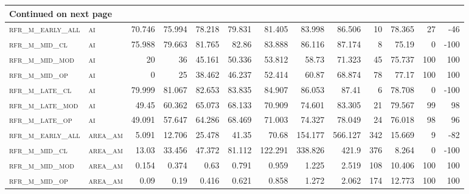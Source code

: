 \begin{landscape}
\begin{center}
\begin{footnotesize}
\begin{longtable}{llrrrrrrrr|rrr}
\hline \multicolumn{13}{|l|}{{Continued on next page}} \\ \hline
\endfoot

\hline \hline
\endlastfoot

\textsc{rfr\_m\_early\_all} & \textsc{ai        }   & 70.746  & 75.994  & 78.218  & 79.831   & 81.405   & 83.998   & 86.506   & 10     & 78.365        & 27            & -46             \\
\textsc{rfr\_m\_mid\_cl   } & \textsc{ai        }   & 75.988  & 79.663  & 81.765  & 82.86    & 83.888   & 86.116   & 87.174   & 8      & 75.19         & 0             & -100            \\
\textsc{rfr\_m\_mid\_mod  } & \textsc{ai        }   & 20      & 36      & 45.161  & 50.336   & 53.812   & 58.73    & 71.323   & 45     & 75.737        & 100           & 100             \\
\textsc{rfr\_m\_mid\_op   } & \textsc{ai        }   & 0       & 25      & 38.462  & 46.237   & 52.414   & 60.87    & 68.874   & 78     & 77.17         & 100           & 100             \\
\textsc{rfr\_m\_late\_cl  } & \textsc{ai        }   & 79.999  & 81.067  & 82.653  & 83.835   & 84.907   & 86.053   & 87.41    & 6      & 78.708        & 0             & -100            \\
\textsc{rfr\_m\_late\_mod } & \textsc{ai        }   & 49.45   & 60.362  & 65.073  & 68.133   & 70.909   & 74.601   & 83.305   & 21     & 79.567        & 99            & 98              \\
\textsc{rfr\_m\_late\_op  } & \textsc{ai        }   & 49.091  & 57.647  & 64.286  & 68.469   & 71.003   & 74.327   & 78.049   & 24     & 76.018        & 98            & 96              \\
\textsc{rfr\_m\_early\_all} & \textsc{area\_am  }   & 5.091   & 12.706  & 25.478  & 41.35    & 70.68    & 154.177  & 566.127  & 342    & 15.669        & 9             & -82             \\
\textsc{rfr\_m\_mid\_cl   } & \textsc{area\_am  }   & 13.03   & 33.456  & 47.372  & 81.112   & 122.291  & 338.826  & 421.9    & 376    & 8.264         & 0             & -100            \\
\textsc{rfr\_m\_mid\_mod  } & \textsc{area\_am  }   & 0.154   & 0.374   & 0.63    & 0.791    & 0.959    & 1.225    & 2.519    & 108    & 10.406        & 100           & 100             \\
\textsc{rfr\_m\_mid\_op   } & \textsc{area\_am  }   & 0.09    & 0.19    & 0.416   & 0.621    & 0.858    & 1.272    & 2.062    & 174    & 12.773        & 100           & 100             \\

\end{longtable}
\end{footnotesize}
\end{center}
\end{landscape}
